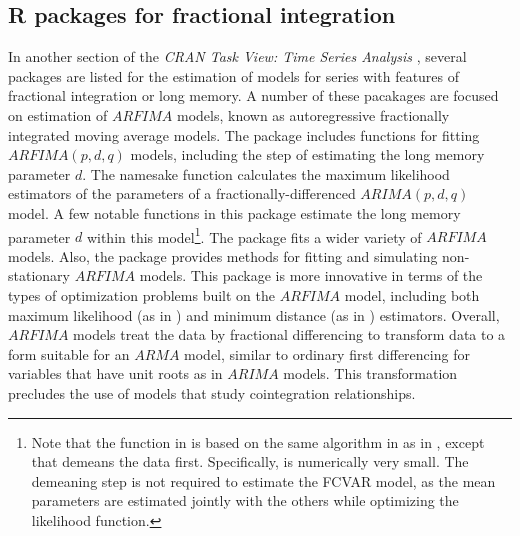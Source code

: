 \documentclass[article]{jss}
\newcommand{\fct}[1]{\code{#1()}}
\begin{document}
\subsection{R packages for fractional integration}

In another section of the \emph{CRAN Task View: Time Series Analysis} \citep{Hyndman2020}, 
several packages are listed for the estimation of models for series with features of fractional integration or long memory. 
A number of these pacakages are focused on estimation of $ARFIMA$ models, known as autoregressive fractionally integrated moving average models. 
The  package \citep{fracdiff2020} includes functions for fitting $ARFIMA(p,d,q)$ models, including the step of estimating the long memory parameter $d$. 
The namesake function \fct{fracdiff} calculates the maximum likelihood estimators of the parameters of a fractionally-differenced $ARIMA(p,d,q)$ model. 
A few notable functions in this package estimate the long memory parameter $d$ within this model\footnote{Note that the \fct{diffseries} function in  is based on the same algorithm in \cite{Jensen2014} as \fct{FracDiff} in , except that \fct{diffseries} demeans the data first. Specifically,  is numerically very small. 
The demeaning step is not required to estimate the FCVAR model, as the mean parameters are estimated jointly with the others while optimizing the likelihood function. }. 
% 
The  package \cite{arfima2018} fits a wider variety of $ARFIMA$ models. 
% 
Also, the  \citep{nsarfima2019} package provides methods for fitting and simulating non-stationary $ARFIMA$ models. 
This package is more innovative in terms of the types of optimization problems built on the $ARFIMA$ model, including both maximum likelihood (as in \citet{Beran1995}) and minimum distance (as in \citet{Mayoral2007}) estimators. 
Overall, $ARFIMA$ models treat the data by fractional differencing to transform data to a form suitable for an $ARMA$ model, 
similar to ordinary first differencing for variables that have unit roots as in $ARIMA$ models. 
This transformation precludes the use of models that study cointegration relationships. 
\end{document}
